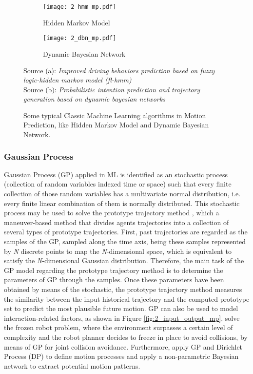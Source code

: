 \begin{figure}[t!]
	\begin{subfigure}{0.5\textwidth}
		\texttt{[image: 2\_hmm\_mp.pdf]}
		\caption{Hidden Markov Model}
		\label{fig:2_hmm_mp}
	\end{subfigure}
	\hfill
	\begin{subfigure}{0.5\textwidth}
		\texttt{[image: 2\_dbn\_mp.pdf]}
		\caption{Dynamic Bayesian Network}
		\label{fig:2_dbn_mp}
	\end{subfigure}
	
	\caption[Some typical Classic Machine Learning algorithms in Motion Prediction]{Some typical Classic Machine Learning algorithms in Motion Prediction, like Hidden Markov Model and Dynamic Bayesian Network.}
	Source (a): \textit{Improved driving behaviors prediction based on fuzzy logic-hidden markov model (fl-hmm)} \cite{deng2018improved} \\
	Source (b): \textit{Probabilistic intention prediction and trajectory generation based on dynamic bayesian networks} \cite{he2019probabilistic}
	\label{fig:2_classic_ml_mp}
\end{figure}

\subsubsection{Gaussian Process}
\label{subsubsec:2_gaussian_process_mp}

Gaussian Process (GP) applied in ML \cite{rasmussen2004gaussian} is identified as an stochastic process (collection of random variables indexed time or space) such that every finite collection of those random variables has a multivariate normal distribution, i.e. every finite linear combination of them is normally distributed. This stochastic process may be used to solve the prototype trajectory method \cite{joseph2011bayesian, tran2014online}, which a maneuver-based method that divides agents trajectories into a collection of several types of prototype trajectories. First, past trajectories are regarded as the samples of the GP, sampled along the time axis, being these samples represented by \textit{N} discrete points to map the \textit{N}-dimensional space, which is equivalent to satisfy the \textit{N}-dimensional Gaussian distribution. Therefore, the main task of the GP model regarding the prototype trajectory method is to determine the parameters of GP through the samples. Once these parameters have been obtained by means of the stochastic, the prototype trajectory method measures the similarity between the input historical trajectory and the computed prototype set to predict the most plausible future motion. GP can also be used to model interaction-related factors, as shown in Figure \ref{fig:2_input_output_mp}. \cite{trautman2010unfreezing} solve the frozen robot problem, where the environment surpasses a certain level of complexity and the robot planner decides to freeze in place to avoid collisions, by means of GP for joint collision avoidance. Furthermore, \cite{guo2019modeling} apply GP and Dirichlet Process (DP) to define motion processes and apply a non-parametric Bayesian network to extract potential motion patterns.

